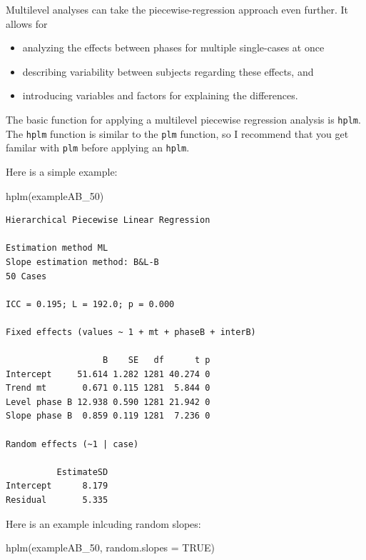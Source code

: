 \documentclass[
]{book}
\newenvironment{Shaded}{\begin{snugshade}}{\end{snugshade}}
\newcommand{\AttributeTok}[1]{\textcolor[rgb]{0.77,0.63,0.00}{#1}}
\newcommand{\ConstantTok}[1]{\textcolor[rgb]{0.00,0.00,0.00}{#1}}
\newcommand{\FunctionTok}[1]{\textcolor[rgb]{0.00,0.00,0.00}{#1}}
\newcommand{\NormalTok}[1]{#1}
\providecommand{\tightlist}{%
  \setlength{\itemsep}{0pt}\setlength{\parskip}{0pt}}
\begin{document}
Multilevel analyses can take the piecewise-regression approach even further. It allows for

\begin{itemize}
\tightlist
\item
  analyzing the effects between phases for multiple single-cases at once
\item
  describing variability between subjects regarding these effects, and
\item
  introducing variables and factors for explaining the differences.
\end{itemize}

The basic function for applying a multilevel piecewise regression analysis is \texttt{hplm}. The \texttt{hplm} function is similar to the \texttt{plm} function, so I recommend that you get familar with \texttt{plm} before applying an \texttt{hplm}.

Here is a simple example:

\begin{Shaded}
\begin{Highlighting}[]
\FunctionTok{hplm}\NormalTok{(exampleAB\_50)}
\end{Highlighting}
\end{Shaded}

\begin{verbatim}
Hierarchical Piecewise Linear Regression

Estimation method ML 
Slope estimation method: B&L-B 
50 Cases

ICC = 0.195; L = 192.0; p = 0.000

Fixed effects (values ~ 1 + mt + phaseB + interB)

                   B    SE   df      t p
Intercept     51.614 1.282 1281 40.274 0
Trend mt       0.671 0.115 1281  5.844 0
Level phase B 12.938 0.590 1281 21.942 0
Slope phase B  0.859 0.119 1281  7.236 0

Random effects (~1 | case)

          EstimateSD
Intercept      8.179
Residual       5.335
\end{verbatim}

Here is an example inlcuding random slopes:

\begin{Shaded}
\begin{Highlighting}[]
\FunctionTok{hplm}\NormalTok{(exampleAB\_50, }\AttributeTok{random.slopes =} \ConstantTok{TRUE}\NormalTok{)}
\end{Highlighting}
\end{Shaded}
\end{document}

